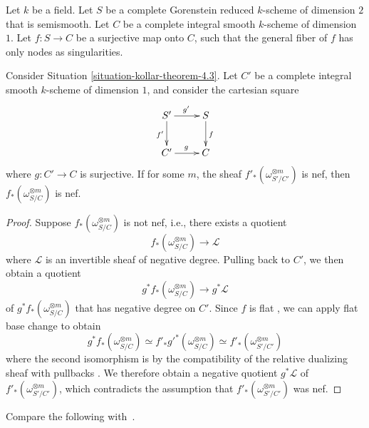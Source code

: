 \begin{situation}
\label{situation-kollar-theorem-4.3}
Let $k$ be a field.
Let $S$ be a complete Gorenstein reduced $k$-scheme of dimension $2$ that is
semismooth.
Let $C$ be a complete integral smooth $k$-scheme of dimension $1$.
Let $f : S \to C$ be a surjective map onto $C$, such that the general fiber of
$f$ has only nodes as singularities.
\end{situation}

\begin{lemma}
\label{lemma-base-change-okay}
Consider Situation \ref{situation-kollar-theorem-4.3}.
Let $C'$ be a complete integral smooth $k$-scheme of dimension $1$, and
consider the cartesian square
$$
\xymatrix{
S' \ar[d]_{f'}\ar[r]^{g'} & S\ar[d]^f\\
C' \ar[r]^g & C
}
$$
where $g: C' \to C$ is surjective.
If for some $m$, the sheaf $f'_*(\omega_{S'/C'}^{\otimes m})$ is nef,
then $f_*(\omega_{S/C}^{\otimes m})$ is nef.
\end{lemma}
\begin{proof}
Suppose $f_*(\omega_{S/C}^{\otimes m})$ is not nef, i.e., there
exists a quotient
$$f_*(\omega_{S/C}^{\otimes m}) \longrightarrow \mathcal{L}$$
where $\mathcal{L}$ is an invertible sheaf of negative degree.
Pulling back to $C'$, we then obtain a quotient
$$g^*f_*(\omega_{S/C}^{\otimes m}) \longrightarrow g^*\mathcal{L}$$
of $g^*f_*(\omega_{S/C}^{\otimes m})$ that has negative degree on $C'$.
Since $f$ is flat \cite[\href{http://stacks.math.columbia.edu/tag/00R4}{Tag
00R4}]{stacks-project}, we can apply flat base change
\cite[\href{http://stacks.math.columbia.edu/tag/02KH}{Tag 02KH}]{stacks-project}
to obtain
$$
g^*f_*(\omega_{S/C}^{\otimes m})
\simeq f'_*g'^*(\omega_{S/C}^{\otimes m})
\simeq f'_*(\omega_{S'/C'}^{\otimes m})
$$
where the second isomorphism is
by the compatibility of the relative dualizing sheaf with pullbacks
\cite[\href{http://stacks.math.columbia.edu/tag/0E4P}{Tag
0E4P}]{stacks-project}.
We therefore obtain a negative quotient $g^*\mathcal{L}$ of
$f'_*(\omega_{S'/C'}^{\otimes m})$, which contradicts the assumption that
$f'_*(\omega_{S'/C'}^{\otimes m})$ was nef.
\end{proof}

Compare the following with~\cite[Theorem 4.3]{ko90}.

